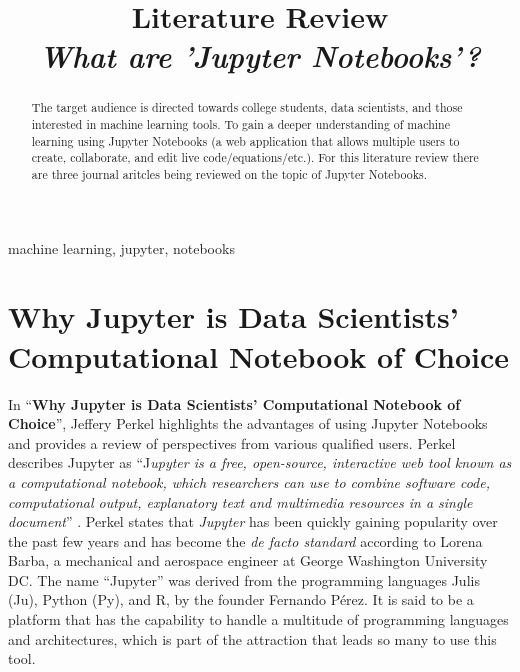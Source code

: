 \documentclass[conference]{IEEEtran}
\begin{document}
\title{Literature Review \\ \textit{What are 'Jupyter Notebooks'?}\\}

\author{
}

\maketitle

\begin{abstract}
    The target audience is directed towards college students, data scientists, and those interested in machine learning tools. To gain a deeper understanding of machine learning using Jupyter Notebooks (a web application that allows multiple users to create, collaborate, and edit live code/equations/etc.). For this literature review there are three journal aritcles being reviewed on the topic of Jupyter Notebooks.
\end{abstract}

\begin{IEEEkeywords}
machine learning, jupyter, notebooks
\end{IEEEkeywords}

% 
\section{Why Jupyter is Data Scientists’ Computational Notebook of Choice}
In “\textbf{Why Jupyter is Data Scientists’ Computational Notebook of Choice}”, Jeffery Perkel highlights the advantages of using Jupyter Notebooks and provides a review of perspectives from various qualified users.  Perkel describes Jupyter as “J\textit{upyter is a free, open-source, interactive web tool known as a computational notebook, which researchers can use to combine software code, computational output, explanatory text and multimedia resources in a single document}” \cite{b1}. Perkel states that \textit{Jupyter} has been quickly gaining popularity over the past few years and has become the \textit{de facto standard} according to Lorena Barba, a mechanical and aerospace engineer at George Washington University DC. The name “Jupyter” was derived from the programming languages Julis (Ju), Python (Py), and R, by the founder Fernando Pérez. It is said to be a platform that has the capability to handle a multitude of programming languages and architectures, which is part of the attraction that leads so many to use this tool.\\
\end{document}
